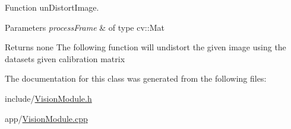 Function un\+Distort\+Image. 


\begin{DoxyParams}{Parameters}
{\em process\+Frame} & of type cv\+::\+Mat \\
\hline
\end{DoxyParams}
\begin{DoxyReturn}{Returns}
none The following function will undistort the given image using the datasets given calibration matrix 
\end{DoxyReturn}


The documentation for this class was generated from the following files\+:\begin{DoxyCompactItemize}
\item 
include/\hyperlink{VisionModule_8h}{Vision\+Module.\+h}\item 
app/\hyperlink{VisionModule_8cpp}{Vision\+Module.\+cpp}\end{DoxyCompactItemize}

